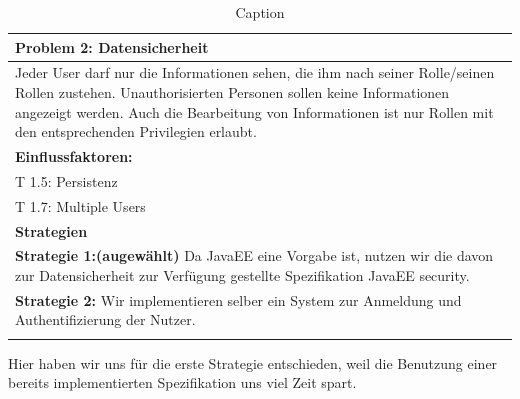 \documentclass[enabledeprecatedfontcommands,fontsize=12pt,paper=a4,twoside]{scrartcl}
\begin{document}
\begin{table}[H]
    \centering
    \begin{tabular}{|p{15cm}|}
    \hline
          \textbf{Problem 2:} Datensicherheit \\ \hline
          Jeder User darf nur die Informationen sehen, die ihm nach seiner Rolle/seinen Rollen zustehen. Unauthorisierten Personen sollen keine Informationen angezeigt werden. Auch die Bearbeitung von Informationen ist nur Rollen mit den entsprechenden Privilegien erlaubt. \\ \hline
          \textbf{Einflussfaktoren: } \\
          T 1.5: Persistenz \\
          T 1.7: Multiple Users\\
          \hline
          \textbf{Strategien} \\ \hline
          \textbf{Strategie 1:(augewählt)} Da JavaEE eine Vorgabe ist, nutzen wir die davon zur Datensicherheit zur Verfügung gestellte Spezifikation JavaEE security.\\
          \textbf{Strategie 2:} Wir implementieren selber ein System zur Anmeldung und Authentifizierung der Nutzer. \\
          \\ \hline
    \end{tabular}

    \caption{Caption}
    \label{tab:my_label}
\end{table}
Hier haben wir uns für die erste Strategie entschieden, weil die Benutzung einer bereits implementierten Spezifikation uns viel Zeit spart. \\
\end{document}
